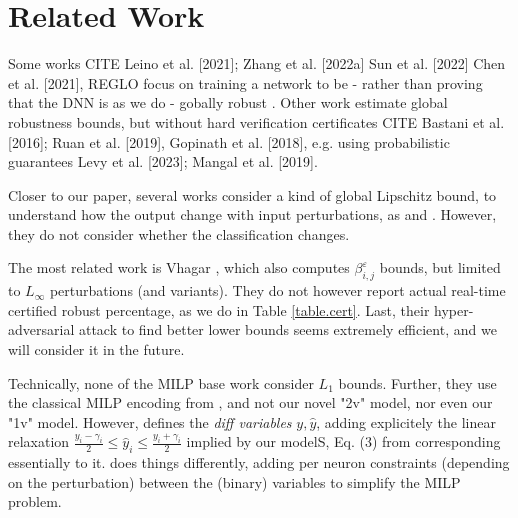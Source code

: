 \section{Related Work}

Some works CITE
Leino et al. [2021]; Zhang et al. [2022a] Sun et al. [2022]  Chen et al. [2021], REGLO focus on training a network to be - rather than proving that the DNN is as we do - gobally robust .
Other work estimate global robustness bounds, but without hard verification certificates CITE Bastani et al. [2016]; Ruan et al. [2019], Gopinath et al. [2018], e.g. using probabilistic guarantees  Levy et al. [2023]; Mangal et al. [2019].

Closer to our paper, several works consider a kind of global Lipschitz bound, to understand how the output change with input perturbations, as \cite{Marabou} and \cite{ITNE,GROCET}. However, they do not consider whether the classification changes. 

The most related work is Vhagar \cite{Vhagar}, which also computes $\beta^\varepsilon_{i,j}$ bounds, but limited to $L_\infty$ perturbations (and variants). They do not however report actual 
real-time certified robust percentage, as we do in Table \ref{table.cert}. Last, their hyper-adversarial attack to find better lower bounds seems extremely efficient, and we will consider it in the future.

Technically, none of the MILP base work \cite{Vhagar,ITNE,GROCET} 
consider $L_1$ bounds. Further, they use the classical MILP encoding from \cite{MILP}, and not our novel "2v" model, nor even our "1v" model. However, \cite{ITNE,GROCET} 
defines the {\em diff variables} $y,\hat{y}$, adding explicitely the linear relaxation $\frac{y_i-\gamma_i}{2} \leq \hat{y}_i \leq \frac{y_i+\gamma_i}{2}$ implied by our modelS, Eq. (3) from \cite{ITNE} corresponding essentially to it. \cite{Vhagar} does things differently, adding per neuron constraints (depending on the perturbation) between the (binary) variables to simplify the MILP problem. 

